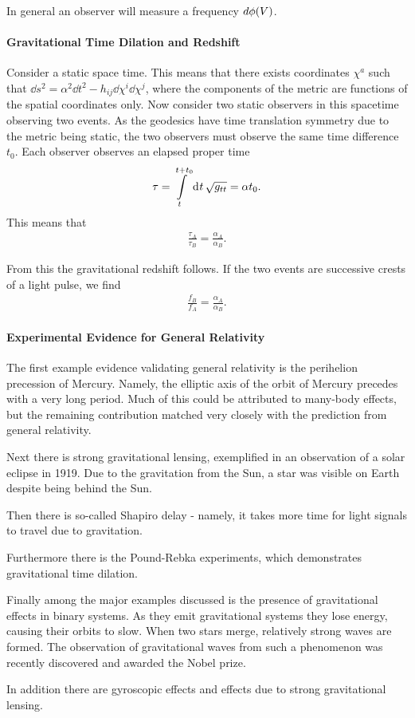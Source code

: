 In general an observer will measure a frequency $d\phi(V)$.

\paragraph{Gravitational Time Dilation and Redshift}
Consider a static space time. This means that there exists coordinates $\chi^{a}$ such that $\dd{s}^{2} = \alpha^{2}\dd{t}^{2} - h_{ij}\dd{\chi}^{i}\dd{\chi}^{j}$, where the components of the metric are functions of the spatial coordinates only. Now consider two static observers in this spacetime observing two events. As the geodesics have time translation symmetry due to the metric being static, the two observers must observe the same time difference $t_{0}$. Each observer observes an elapsed proper time
\begin{align*}
	\tau = \int\limits_{t}^{t + t_{0}}\dd[]{t}\sqrt{g_{tt}} = \alpha t_{0}.
\end{align*}
This means that
\begin{align*}
	\frac{\tau_{A}}{\tau_{B}} = \frac{\alpha_{A}}{\alpha_{B}}.
\end{align*}

From this the gravitational redshift follows. If the two events are successive crests of a light pulse, we find
\begin{align*}
	\frac{f_{B}}{f_{A}} = \frac{\alpha_{A}}{\alpha_{B}}.
\end{align*}

\paragraph{Experimental Evidence for General Relativity}
The first example evidence validating general relativity is the perihelion precession of Mercury. Namely, the elliptic axis of the orbit of Mercury precedes with a very long period. Much of this could be attributed to many-body effects, but the remaining contribution matched very closely with the prediction from general relativity.

Next there is strong gravitational lensing, exemplified in an observation of a solar eclipse in 1919. Due to the gravitation from the Sun, a star was visible on Earth despite being behind the Sun.

Then there is so-called Shapiro delay - namely, it takes more time for light signals to travel due to gravitation.

Furthermore there is the Pound-Rebka experiments, which demonstrates gravitational time dilation.

Finally among the major examples discussed is the presence of gravitational effects in binary systems. As they emit gravitational systems they lose energy, causing their orbits to slow. When two stars merge, relatively strong waves are formed. The observation of gravitational waves from such a phenomenon was recently discovered and awarded the Nobel prize.

In addition there are gyroscopic effects and effects due to strong gravitational lensing.